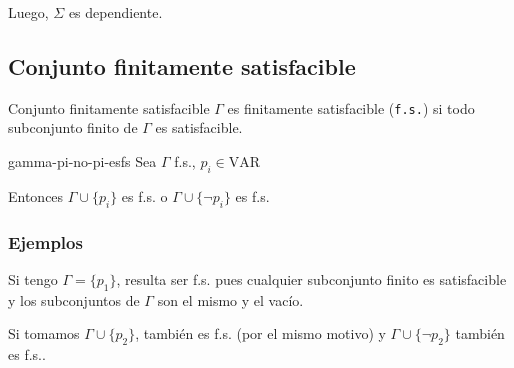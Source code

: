 \begin{itemize}
\begin{enumerate}
\begin{enumerate}
                        Luego, $\Sigma$ es dependiente.

                \end{enumerate}

                \begin{center}
                \end{center}
        \end{enumerate}
\end{itemize}

\subsection{Conjunto finitamente satisfacible}

\begin{definicion}{Conjunto finitamente satisfacible}{}
    $\Gamma$ es finitamente satisfacible (\Verb+f.s.+) si todo subconjunto
    finito de $\Gamma$ es satisfacible.
\end{definicion}

\medskip

\begin{lema}{}{gamma-pi-no-pi-esfs}
    Sea $\Gamma$ f.s., $p_i \in \mathrm{VAR}$

    \medskip


    Entonces $\Gamma \cup \{ p_i \}$ es f.s. o $\Gamma \cup \{ \neg p_i \}$
    es f.s.
\end{lema}

\subsubsection{Ejemplos}

Si tengo $\Gamma = \{ p_1 \}$, resulta ser f.s. pues cualquier subconjunto
finito es satisfacible y los subconjuntos de $\Gamma$ son el mismo y el
vacío.

Si tomamos $\Gamma \cup \{ p_2 \}$, también es f.s. (por el mismo motivo) y 
$\Gamma \cup \{ \neg p_2 \}$ también es f.s..



